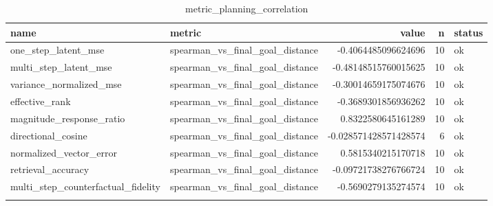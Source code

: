 \begin{table}
\centering
\begin{tabular}{llrrl}
name & metric & value & n & status \\
\hline
one\_step\_latent\_mse & spearman\_vs\_final\_goal\_distance & -0.4064485096624696 & 10 & ok \\
multi\_step\_latent\_mse & spearman\_vs\_final\_goal\_distance & -0.48148515760015625 & 10 & ok \\
variance\_normalized\_mse & spearman\_vs\_final\_goal\_distance & -0.30014659175074676 & 10 & ok \\
effective\_rank & spearman\_vs\_final\_goal\_distance & -0.3689301856936262 & 10 & ok \\
magnitude\_response\_ratio & spearman\_vs\_final\_goal\_distance & 0.8322580645161289 & 10 & ok \\
directional\_cosine & spearman\_vs\_final\_goal\_distance & -0.028571428571428574 & 6 & ok \\
normalized\_vector\_error & spearman\_vs\_final\_goal\_distance & 0.5815340215170718 & 10 & ok \\
retrieval\_accuracy & spearman\_vs\_final\_goal\_distance & -0.09721738276766724 & 10 & ok \\
multi\_step\_counterfactual\_fidelity & spearman\_vs\_final\_goal\_distance & -0.5690279135274574 & 10 & ok \\
\caption{metric\_planning\_correlation}
\end{tabular}
\end{table}
